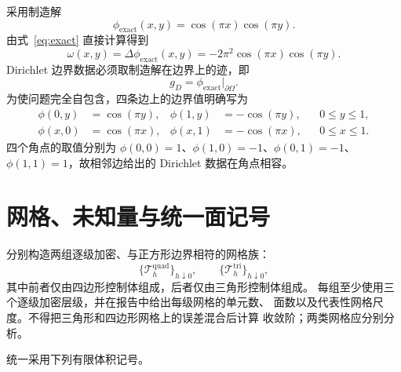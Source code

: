 \documentclass[11pt,a4paper]{ctexart}
\newcommand{\T}{\mathcal{T}}
\begin{document}
采用制造解
\begin{equation}
  \phi_{\mathrm{exact}}(x,y)
  =\cos(\pi x)\cos(\pi y).
  \label{eq:exact}
\end{equation}
由式~\eqref{eq:exact} 直接计算得到
\begin{equation}
  \omega(x,y)
  =\Delta\phi_{\mathrm{exact}}(x,y)
  =-2\pi^2\cos(\pi x)\cos(\pi y).
  \label{eq:source}
\end{equation}
Dirichlet 边界数据必须取制造解在边界上的迹，即
\begin{equation}
  g_D=\phi_{\mathrm{exact}}\big|_{\partial\Omega}.
\end{equation}
为使问题完全自包含，四条边上的边界值明确写为
\begin{subequations}\label{eq:explicit-bc}
\begin{align}
  \phi(0,y)&= \cos(\pi y),
  &\phi(1,y)&=-\cos(\pi y),
  &&0\le y\le1,\\
  \phi(x,0)&= \cos(\pi x),
  &\phi(x,1)&=-\cos(\pi x),
  &&0\le x\le1.
\end{align}
\end{subequations}
四个角点的取值分别为
$\phi(0,0)=1$、$\phi(1,0)=-1$、$\phi(0,1)=-1$、
$\phi(1,1)=1$，故相邻边给出的 Dirichlet 数据在角点相容。

\section{网格、未知量与统一面记号}

分别构造两组逐级加密、与正方形边界相符的网格族：
\begin{equation}
  \{\T_h^{\mathrm{quad}}\}_{h\downarrow0},
  \qquad
  \{\T_h^{\mathrm{tri}}\}_{h\downarrow0},
\end{equation}
其中前者仅由四边形控制体组成，后者仅由三角形控制体组成。
每组至少使用三个逐级加密层级，并在报告中给出每级网格的单元数、
面数以及代表性网格尺度。不得把三角形和四边形网格上的误差混合后计算
收敛阶；两类网格应分别分析。

统一采用下列有限体积记号。
\end{document}
